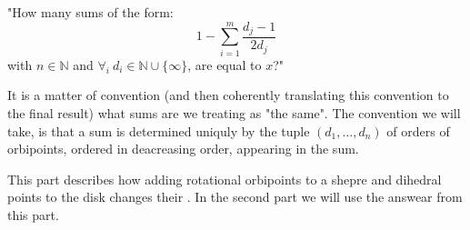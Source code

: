 "How many sums of the form:
\begin{equation}\label{counting D2}
1-\sum_{i=1}^m \frac{d_j-1}{2d_j} 
\end{equation} 
with $n\in \mathbb{N}$ and $\forall_i\ d_i\in\mathbb{N}\cup\{\infty\}$, are equal to $x$?"

It is a matter of convention (and then coherently translating this convention to the final result) 
what sums are we treating as "the same". The convention we will take, is that a sum is determined 
uniquly by the tuple $(d_1,\dots,d_n)$ 
of orders 
of orbipoints, ordered in deacreasing order, appearing in the sum. 

This part describes how adding rotational orbipoints to a shepre and dihedral points 
to the disk changes their \Eoc. 
In the second part we will use the answear from this part.
